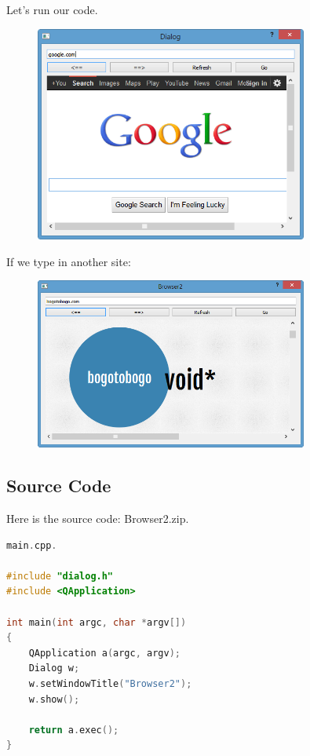Let's run our code.

\begin{figure}[htbp]
\centering
\includegraphics[width=0.8\textwidth]{../manuscript/images/Browser2RunA}
\caption{}
\end{figure}

If we type in another site:

\begin{figure}[htbp]
\centering
\includegraphics[width=0.8\textwidth]{../manuscript/images/Browser2RunB}
\caption{}
\end{figure}

\subsection{Source Code}\label{source-code}

Here is the source code: Browser2.zip.

\begin{lstlisting}[language=c++, numbers=none]
main.cpp.

#include "dialog.h"
#include <QApplication>

int main(int argc, char *argv[])
{
    QApplication a(argc, argv);
    Dialog w;
    w.setWindowTitle("Browser2");
    w.show();

    return a.exec();
}
\end{lstlisting}

